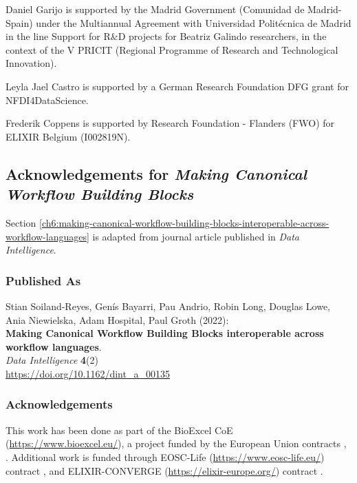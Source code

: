 Daniel Garijo is supported by the Madrid Government (Comunidad de
Madrid-Spain) under the Multiannual Agreement with Universidad
Politécnica de Madrid in the line Support for R\&D projects for Beatriz
Galindo researchers, in the context of the V PRICIT (Regional Programme
of Research and Technological Innovation).

Leyla Jael Castro is supported by a German Research Foundation DFG grant
for NFDI4DataScience.

Frederik Coppens is supported by Research Foundation - Flanders (FWO)
for ELIXIR Belgium (I002819N).



\subsection{Acknowledgements for \emph{Making Canonical Workflow Building Blocks}}\label{ch11:canonical}

Section \vref{ch6:making-canonical-workflow-building-blocks-interoperable-across-workflow-languages} is adapted from journal article published in \emph{Data Intelligence}.

\subsubsection*{Published As}

Stian Soiland-Reyes, Genís Bayarri, Pau Andrio, Robin Long, Douglas
Lowe, Ania Niewielska, Adam Hospital, Paul Groth (2022):\\
\textbf{Making Canonical Workflow Building Blocks interoperable across
workflow languages}.\\
\emph{Data Intelligence} \textbf{4}(2)\\
\url{https://doi.org/10.1162/dint_a_00135}

\hypertarget{acknowledgements-3}{%
\subsubsection*{Acknowledgements}}

This work has been done as part of the BioExcel CoE
(\url{https://www.bioexcel.eu/}), a project funded by the European Union
contracts
,
. Additional work is funded through EOSC-Life
(\url{https://www.eosc-life.eu/}) contract
, and ELIXIR-CONVERGE (\url{https://elixir-europe.org/}) contract
.

